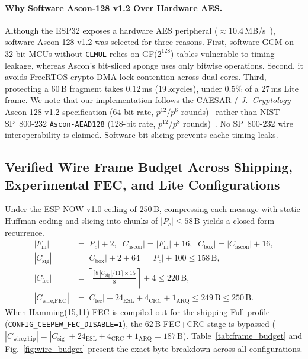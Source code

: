 \documentclass[conference]{IEEEtran}
\begin{document}
\paragraph{Why Software Ascon-128 v1.2 Over Hardware AES.} Although the ESP32 exposes a hardware AES peripheral ($\approx 10.4$\,MB/s~\cite{oryx_esp32}), software Ascon-128 v1.2 was selected for three reasons. First, software GCM on 32-bit MCUs without \texttt{CLMUL} relies on GF($2^{128}$) tables vulnerable to timing leakage, whereas Ascon's bit-sliced sponge uses only bitwise operations. Second, it avoids FreeRTOS crypto-DMA lock contention across dual cores. Third, protecting a $60$\,B fragment takes $0.12$\,ms ($19$\,kcycles), under $0.5\%$ of a $27$\,ms Lite frame. We note that our implementation follows the CAESAR / \textit{J.\ Cryptology} Ascon-128 v1.2 specification ($64$-bit rate, $p^{12}/p^{6}$ rounds)~\cite{dobraunig2021} rather than NIST SP~800-232 \texttt{Ascon-AEAD128} ($128$-bit rate, $p^{12}/p^{8}$ rounds)~\cite{nist_ascon2025}. No SP~800-232 wire interoperability is claimed. Software bit-slicing prevents cache-timing leaks.

\subsection{Verified Wire Frame Budget Across Shipping, Experimental FEC, and Lite Configurations}
Under the ESP-NOW v1.0 ceiling of $250$\,B, compressing each message with static Huffman coding and slicing into chunks of $|P_c| \le 58$\,B yields a closed-form recurrence.
\begin{align}
|F_{\text{in}}| &= |P_c| + 2, \; |C_{\text{ascon}}| = |F_{\text{in}}| + 16, \; |C_{\text{box}}| = |C_{\text{ascon}}| + 16, \label{eq:box}\\
|C_{\text{sig}}| &= |C_{\text{box}}| + 2 + 64 = |P_c| + 100 \le 158\,\text{B}, \label{eq:sig}\\
|C_{\text{fec}}| &= \left\lceil \frac{\lceil 8\,|C_{\text{sig}}| / 11 \rceil \times 15}{8} \right\rceil + 4 \le 220\,\text{B}, \label{eq:fec}\\
|C_{\text{wire,FEC}}| &= |C_{\text{fec}}| + 24_{\text{ESL}} + 4_{\text{CRC}} + 1_{\text{ARQ}} \le 249\,\text{B} \le 250\,\text{B}. \label{eq:wire}
\end{align}
When Hamming(15,11) FEC is compiled out for the shipping Full profile (\texttt{CONFIG\_CEEPEW\_FEC\_DISABLE=1}), the $62$\,B FEC+CRC stage is bypassed ($|C_{\text{wire,ship}}| = |C_{\text{sig}}| + 24_{\text{ESL}} + 4_{\text{CRC}} + 1_{\text{ARQ}} = 187$\,B). Table~\ref{tab:frame_budget} and Fig.~\ref{fig:wire_budget} present the exact byte breakdown across all configurations.
\end{document}
